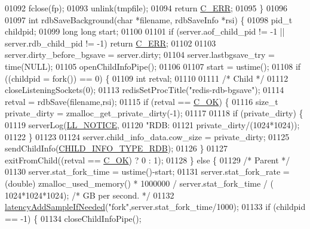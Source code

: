 \begin{DoxyCode}
{{{{{{{{{{{{{{{01092     fclose(fp);
01093     unlink(tmpfile);
01094     \textcolor{keywordflow}{return} \hyperlink{server_8h_af98ac28d5f4d23d7ed5985188e6fb7d1}{C\_ERR};
01095 \}
01096 
01097 \textcolor{keywordtype}{int} rdbSaveBackground(\textcolor{keywordtype}{char} *filename, rdbSaveInfo *rsi) \{
01098     pid\_t childpid;
01099     \textcolor{keywordtype}{long} \textcolor{keywordtype}{long} start;
01100 
01101     \textcolor{keywordflow}{if} (server.aof\_child\_pid != -1 || server.rdb\_child\_pid != -1) \textcolor{keywordflow}{return} 
      \hyperlink{server_8h_af98ac28d5f4d23d7ed5985188e6fb7d1}{C\_ERR};
01102 
01103     server.dirty\_before\_bgsave = server.dirty;
01104     server.lastbgsave\_try = time(NULL);
01105     openChildInfoPipe();
01106 
01107     start = ustime();
01108     \textcolor{keywordflow}{if} ((childpid = fork()) == 0) \{
01109         \textcolor{keywordtype}{int} retval;
01110 
01111         \textcolor{comment}{/* Child */}
01112         closeListeningSockets(0);
01113         redisSetProcTitle(\textcolor{stringliteral}{"redis-rdb-bgsave"});
01114         retval = rdbSave(filename,rsi);
01115         \textcolor{keywordflow}{if} (retval == \hyperlink{server_8h_a303769ef1065076e68731584e758d3e1}{C\_OK}) \{
01116             size\_t private\_dirty = zmalloc\_get\_private\_dirty(-1);
01117 
01118             \textcolor{keywordflow}{if} (private\_dirty) \{
01119                 serverLog(\hyperlink{server_8h_a8c54c191e436c7dd3012167212692401}{LL\_NOTICE},
01120                     \textcolor{stringliteral}{"RDB: %
01121                     private\_dirty/(1024*1024));
01122             \}
01123 
01124             server.child\_info\_data.cow\_size = private\_dirty;
01125             sendChildInfo(\hyperlink{server_8h_a878f18d9e3d0af58b81a17d764a81dbe}{CHILD\_INFO\_TYPE\_RDB});
01126         \}
01127         exitFromChild((retval == \hyperlink{server_8h_a303769ef1065076e68731584e758d3e1}{C\_OK}) ? 0 : 1);
01128     \} \textcolor{keywordflow}{else} \{
01129         \textcolor{comment}{/* Parent */}
01130         server.stat\_fork\_time = ustime()-start;
01131         server.stat\_fork\_rate = (\textcolor{keywordtype}{double}) zmalloc\_used\_memory() * 1000000 / server.stat\_fork\_time / (
      1024*1024*1024); \textcolor{comment}{/* GB per second. */}
01132         \hyperlink{latency_8h_a77922ab34035890c90f98831a9071359}{latencyAddSampleIfNeeded}(\textcolor{stringliteral}{"fork"},server.stat\_fork\_time/1000);
01133         \textcolor{keywordflow}{if} (childpid == -1) \{
01134             closeChildInfoPipe();
}}}}}}}}}}}}}}}}
\end{DoxyCode}
